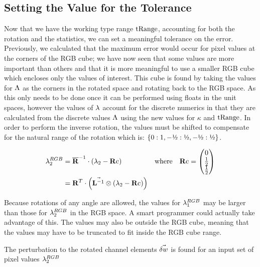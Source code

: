 \subsection{Setting the Value for the Tolerance}
Now that we have the working type range $\text{tRange}$, accounting for both the rotation and the statistics, we can set a meaningful tolerance on the error. Previously, we calculated that the maximum error would occur for pixel values at the corners of the RGB cube; we have now seen that some values are more important than others and that it is more meaningful to use a smaller RGB cube which encloses only the values of interest. This cube is found by taking the values for $\Lambda$ as the corners in the rotated space and rotating back to the RGB space. As this only needs to be done once it can be performed using floats in the unit spaces, however the values of $\lambda$ account for the discrete numerics in that they are calculated from the discrete values $\Lambda$ using the new values for $\kappa$ and $\text{tRange}$. In order to perform the inverse rotation, the values must be shifted to compensate for the natural range of the rotation which is: $\{0:1,-\text{\textonehalf}:\text{\textonehalf},-\text{\textonehalf}:\text{\textonehalf}\}$. 

\begin{align}
\discard^{RGB}_2 &= \nR^{-1} \cdot \left( \discard_2 - \Rc
        \right) & \text{where} \quad \Rc=\begin{pmatrix}
                 0   \\
                 \frac{1}{2}    \\
                 \frac{1}{2}     \\
                \end{pmatrix} \\
&= \R^{T} \cdot \left( \nS \otimes \left( \discard_2 - \Rc
                \right) \right)  
\end{align}

Because rotations of any angle are allowed, the values for $\lambda^{RGB}_1$ may be larger than those for $\lambda^{RGB}_2$ in the RGB space. A smart programmer could actually take advantage of this. The values may also be outside the RGB cube, meaning that the values may have to be truncated to fit inside the RGB cube range. 

The perturbation to the rotated channel elements $\vec{\delta w}$ is found for an input set of pixel values $\lambda^{RGB}_2$

